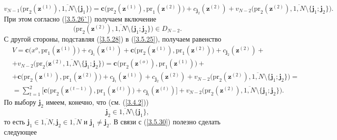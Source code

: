 \documentclass[12pt]{report}
\newcommand{\bfn}{\begin{equation}}
\newcommand{\efn}{\end{equation}}
\newcommand{\ov}{\overline}
\newcommand{\sm}{\setminus}
\begin{document}
{\bfn\label{3.5.28}
v_{N-1}\bigl(\mathrm{pr}_2(\mathbf{z}^{(1)}),\ov{1,N}\sm\{\mathbf{j}_1\}\bigl) =
\mathbf{c}\bigl(\mathrm{pr}_2(\mathbf{z}^{(1)}),\mathrm{pr}_1(\mathbf{z}^{(2)})) +
c_{\mathbf{j}_2}(\mathbf{z}^{(2)}) + v_{N-2}\bigl(\mathrm{pr}_2(\mathbf{z}^{(2)}),
\ov{1,N}\sm\{\mathbf{j}_1;\mathbf{j}_2\}\bigl).
\efn
При этом согласно (\ref{3.5.26`}) получаем включение
\bfn\label{3.5.28}
\bigl(\mathrm{pr}_2(\mathbf{z}^{(2)}),\ov{1,N}\sm\{\mathbf{j}_1;\mathbf{j}_2\}\bigl)\in D_{N-2}.
\efn
С другой стороны, подставляя  (\ref{3.5.28}) в (\ref{3.5.25}), получаем равенство
\begin{eqnarray}
&V = \mathbf{c}\bigl(x^o,\mathrm{pr}_1(\mathbf{z}^{(1)})\bigl) +
c_{\mathbf{j}_1}(\mathbf{z}^{(1)}) + \mathbf{c}\bigl(\mathrm{pr}_2(\mathbf{z}^{(1)}),
\mathrm{pr}_1(\mathbf{z}^{(2)})\bigl) + c_{\mathbf{j}_2}(\mathbf{z}^{(2)}) +
&\nonumber\\
&+v_{N-2}\bigl(\mathrm{pr}_2(\mathbf{z}^{(2)},\ov{1,N}\sm\{\mathbf{j}_1;\mathbf{j}_2\}\bigl) =
\mathbf{c}\bigl(\mathrm{pr}_2(\mathbf{z}^{(o)}),\mathrm{pr}_1(\mathbf{z}^{(1)})\bigl) +
&\nonumber\\
&+ \mathbf{c}\bigl(\mathrm{pr}_2(\mathbf{z}^{(1)}),\mathrm{pr}_1(\mathbf{z}^{(2)})\bigl) +
c_{\mathbf{j}_1}(\mathbf{z}^{(1)}) + c_{\mathbf{j}_2}(\mathbf{z}^{(2)}) +
v_{N-2}\bigl(\mathrm{pr}_2(\mathbf{z}^{(2)}),\ov{1,N}\sm\{\mathbf{j}_1;\mathbf{j}_2\}\bigl) =
&\nonumber\\
&= \sum\limits_{t=1}^2 \bigl[\mathbf{c}\bigl(\mathrm{pr}_2(\mathbf{z}^{(t-1)}),
\mathrm{pr}_1(\mathbf{z}^{(t)})\bigl) + c_{\mathbf{j}_t}(\mathbf{z}^{(t)})\bigl] +
v_{N-2}\bigl(\mathrm{pr}_2(\mathbf{z}^{(2)}),\ov{1,N}\sm\{\mathbf{j}_1;\mathbf{j}_2\}\bigl).
&\label{3.5.30}
\end{eqnarray}
По выбору $\mathbf{j}_2$ имеем, конечно, что (см. (\ref{3.4.2}))
\bfn\label{3.5.31`}\mathbf{j}_2 \in \ov{1,N}\sm\{\mathbf{j}_1\},
\efn
то есть $\mathbf{j}_1\in \ov{1,N}, \mathbf{j}_2\in \ov{1,N}$ и $\mathbf{j}_1 \neq
\mathbf{j}_2.$ В связи с (\ref{3.5.30}) полезно сделать следующее

}
\end{document}
